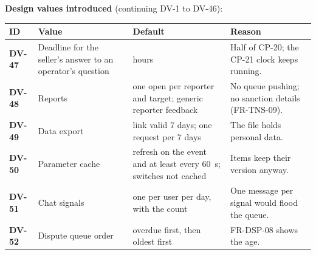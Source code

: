 \documentclass[11pt,a4paper]{article}
\newenvironment{dtable}[1]{\small\begin{longtable}{#1}}{\end{longtable}}
\begin{document}
\textbf{Design values introduced} (continuing DV-1 to DV-46):
\begin{dtable}{@{}>{\bfseries}p{1.3cm}>{\raggedright\arraybackslash}p{4.4cm}>{\raggedright\arraybackslash}p{4.8cm}>{\raggedright\arraybackslash}p{4.4cm}@{}}
\toprule
\textnormal{\textbf{ID}} & \textbf{Value} & \textbf{Default} & \textbf{Reason} \\ \midrule \endhead
DV-47 & Deadline for the seller's answer to an operator's question & 24 hours & Half of CP-20; the CP-21 clock keeps running. \\
DV-48 & Reports & one open per reporter and target; generic reporter feedback & No queue pushing; no sanction details (FR-TNS-09). \\
DV-49 & Data export & link valid 7 days; one request per 7 days & The file holds personal data. \\
DV-50 & Parameter cache & refresh on the event and at least every 60~s; switches not cached & Items keep their version anyway. \\
DV-51 & Chat signals & one per user per day, with the count & One message per signal would flood the queue. \\
DV-52 & Dispute queue order & overdue first, then oldest first & FR-DSP-08 shows the age. \\
\bottomrule
\end{dtable}

\filbreak
\end{document}
